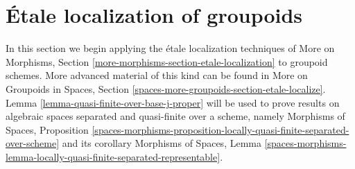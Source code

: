 \section{\'Etale localization of groupoids}
\label{section-etale-localize}

\noindent
In this section we begin applying the \'etale localization techniques of
More on Morphisms, Section \ref{more-morphisms-section-etale-localization}
to groupoid schemes. More advanced material of this kind can be found in
More on Groupoids in Spaces,
Section \ref{spaces-more-groupoids-section-etale-localize}.
Lemma \ref{lemma-quasi-finite-over-base-j-proper}
will be used to prove results on algebraic spaces
separated and quasi-finite over a scheme, namely
Morphisms of Spaces, Proposition
\ref{spaces-morphisms-proposition-locally-quasi-finite-separated-over-scheme}
and its corollary
Morphisms of Spaces, Lemma
\ref{spaces-morphisms-lemma-locally-quasi-finite-separated-representable}.

